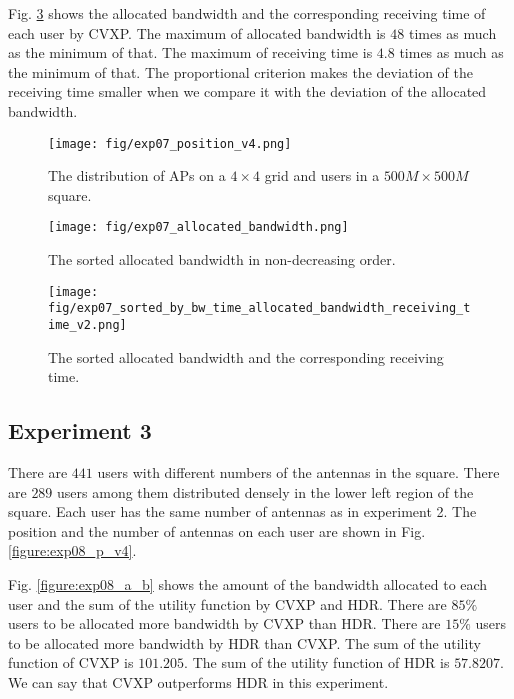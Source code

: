 	
	Fig. \ref{figure:exp07_s_b_b_t_a_b_r_t_v2} shows the allocated bandwidth and the corresponding receiving time of each user by CVXP. The maximum of allocated bandwidth is $48$ times as much as the minimum of that. The maximum of receiving time is $4.8$ times as much as the minimum of that. The proportional criterion makes the deviation of the receiving time smaller when we compare it with the deviation of the allocated bandwidth.

		\begin{figure}
			\begin{center}
				\texttt{[image: fig/exp07\_position\_v4.png]}
				\caption{The distribution of APs on a $4 \times 4$ grid and users in a $500M \times 500M$ square.}
				\label{figure:exp07_p_v4}
			\end{center}
		\end{figure}
	
		\begin{figure}
			\begin{center}
				\texttt{[image: fig/exp07\_allocated\_bandwidth.png]}
				\caption{The sorted allocated bandwidth in non-decreasing order.}
				\label{figure:exp07_a_b}
			\end{center}
		\end{figure}

		\begin{figure}
			\begin{center}
				\texttt{[image: fig/exp07\_sorted\_by\_bw\_time\_allocated\_bandwidth\_receiving\_time\_v2.png]}
				\caption{The sorted allocated bandwidth and the corresponding receiving time.}
				\label{figure:exp07_s_b_b_t_a_b_r_t_v2}
			\end{center}
		\end{figure}

\subsection{Experiment 3}
	There are $441$ users with different numbers of the antennas in the square. There are $289$ users among them distributed densely in the lower left region of the square. Each user has the same number of antennas as in experiment 2. The position and the number of antennas on each user are shown in Fig. \ref{figure:exp08_p_v4}.
	
	Fig. \ref{figure:exp08_a_b} shows the amount of the bandwidth allocated to each user and the sum of the utility function by CVXP and HDR. There are $85\%$ users to be allocated more bandwidth by CVXP than HDR. There are $15\%$ users to be allocated more bandwidth by HDR than CVXP. The sum of the utility function of CVXP is $101.205$. The sum of the utility function of HDR is $57.8207$. We can say that CVXP outperforms HDR in this experiment.

